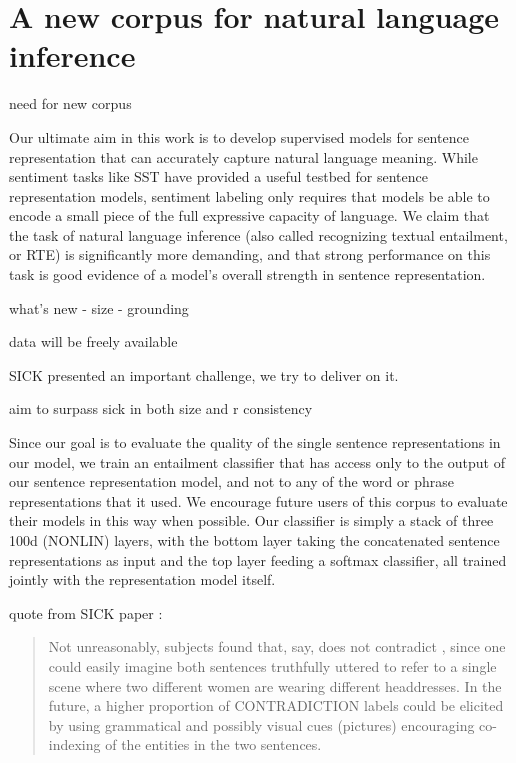 \section{A new corpus for natural language inference}\label{sec:discussion}

need for new corpus

Our ultimate aim in this work is to develop supervised models for sentence representation that can accurately capture natural language meaning. While sentiment tasks like SST have provided a useful testbed for sentence representation models, sentiment labeling only requires that models be able to encode a small piece of the full expressive capacity of language. We claim that the task of natural language inference (also called recognizing textual entailment, or RTE) is significantly more demanding, and that strong performance on this task is good evidence of a model's overall strength in sentence representation.



what's new
- size
- grounding

data will be freely available

SICK presented an important challenge, we try to deliver on it.

aim to surpass sick in both size and r consistency

Since our goal is to evaluate the quality of the single sentence representations in our model, we train an entailment classifier that has access only to the output of our sentence representation model, and not to any of the word or phrase representations that it used. We encourage future users of this corpus to evaluate their models in this way when possible. Our classifier is simply a stack of three 100d (NONLIN) layers, with the bottom layer taking the concatenated sentence representations as input and the top layer feeding a softmax classifier, all trained jointly with the representation model itself.

quote from SICK paper \cite{marelli2014sick}:

\begin{quote}
Not unreasonably, subjects found that, say,  does not contradict , since one could easily imagine both sentences truthfully uttered to refer to a single scene where two different women are wearing different headdresses. In the future, a higher proportion of CONTRADICTION labels could be elicited by using grammatical and possibly visual cues (pictures) encouraging co-indexing of the entities in the two sentences.
\end{quote}

